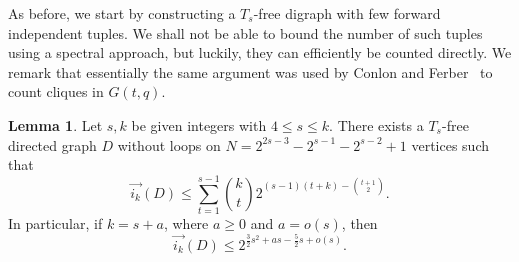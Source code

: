 \documentclass{article}
\theoremstyle{plain}
\newtheorem{lemma}[theorem]{Lemma}
\theoremstyle{definition}
\newtheorem{lemma}{Lemma}
\newcommand{\fwi}[1]{\overrightarrow{i_{#1}}}
\begin{document}
As before, we start by constructing a $T_s$-free digraph with few forward independent tuples. We shall not be able to bound the number of such tuples using a spectral approach, but luckily, they can efficiently be counted directly. We remark that essentially the same argument was used by Conlon and Ferber~\cite{conlon-ferber} to count cliques in $G(t, q)$.
\begin{lemma} \label{lem:F2-fw-indep-sets}
    Let $s, k$ be given integers with $4 \le s \le k$. There exists a $T_s$-free directed graph $D$ without loops on $N = 2^{2s-3} - 2^{s-1} - 2^{s-2} + 1$ vertices such that 
    \[ \fwi{k}(D) \le \sum_{t=1}^{s-1} \binom{k}{t} 2^{(s-1)(t+k) - \binom{t+1}{2}}. \]
    In particular, if $k = s+a$, where $a \ge 0$ and $a = o(s)$, then
    \[ \fwi{k}(D) \le 2^{\frac{3}{2}s^2 + as - \frac{5}{2}s + o(s)}. \]
\end{lemma}
\end{document}
